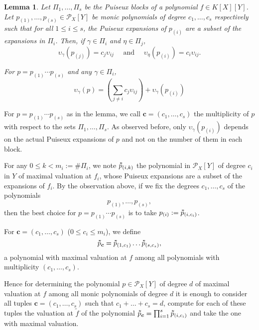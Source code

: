 \documentclass[a4paper,11pt]{amsart}%
\theoremstyle{definition}
\theoremstyle{plain}
\newtheorem{lemma}[defn]{Lemma}
\theoremstyle{remark}
\newcommand{\Px}{{\mathcal{P}_X}}
\newcommand{\vardbtilde}[1]{\tilde{\raisebox{0pt}[0.85\height]{$\tilde{#1}$}}}
\begin{document}
\begin{lemma}
\label{formula:blocks}
Let $\Pi_1, \dots, \Pi_s$ be the Puiseux blocks of a polynomial $f \in K[X][Y]$. Let $p_{(1)}, \dots, p_{(s)} \in \mathcal{P}_{X}[Y]$ be monic polynomials of degree $c_1, \dots, c_s$ respectively such that for all $1 \le i \le s$, the Puiseux expansions of $p_{(i)}$ are a subset of the expansions in $\Pi_i$. Then, if $\gamma \in \Pi_i$ and $\eta \in \Pi_j$,
$$
\upsilon_{\gamma}(p_{(j)}) = c_j \upsilon_{ij} \quad \text{ and } \quad \upsilon_{\eta}(p_{(i)}) = c_i \upsilon_{ij}.
$$

For $p = p_{(1)} \cdots p_{(s)}$ and any $\gamma \in \Pi_i$,
\[
\boxed{
\upsilon_{\gamma}(p) = \left(\textstyle \sum_{j \ne i} c_j \upsilon_{ij}\right) + \upsilon_{\gamma}(p_{(i)})}
\]
\end{lemma}

For $p = p_{(1)} \cdots p_{(s)}$ as in the lemma, we call $\bm{c} = (c_1, \dots, c_s)$ the multiplicity of $p$ with respect to the sets $\Pi_1, \dots, \Pi_s$.
As observed before, only $\upsilon_{\gamma}(p_{(i)})$ depends on the actual Puiseux expansions of $p$ and not on the number of them in each block.

For any $0 \le k < m_i := \#\Pi_i$, we note $\vardbtilde p_{(i, k)}$ the polynomial in $\Px[Y]$ of degree $c_i$ in $Y$ of maximal valuation at $f_i$, whose Puiseux expansions are a subset of the expansions of $f_i$.
By the observation above, if we fix the degrees $c_1, \dots, c_s$ of the polynomials
$$p_{(1)}, \dots, p_{(s)},$$
then the best choice for $p = p_{(1)}\cdots p_{(s)}$ is to take $p_{(i)} := \vardbtilde  p_{(i, c_i)}$.

For $\bm{c} = (c_1, \dots, c_s)$ ($0 \le c_i \le m_i$), we define
$$
\vardbtilde p_{\bm{c}} = \vardbtilde p_{(1, c_1)} \dots \vardbtilde p_{(s, c_s)},
$$
a polynomial with maximal valuation at $f$ among all polynomials with multiplicity $(c_1, \dots, c_s)$.


Hence for determining the polynomial $p \in {\mathcal{P}_{X}}[Y]$ of degree $d$ of maximal valuation at $f$ among all monic polynomials of degree $d$ it is enough to consider all tuples $\bm{c}=(c_1, \dots, c_s)$ such that $c_1 + \dots + c_s = d$, compute for each of these tuples the valuation at $\tilde f$ of the polynomial $\vardbtilde p_{\bm{c}} = \prod_{i=1}^s \vardbtilde p_{(i, c_i)}$ and take the one with maximal valuation.
\end{document}
